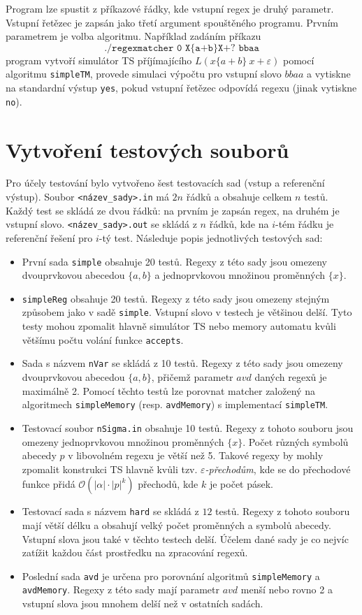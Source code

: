 \documentclass[thesis=B,czech]{FITthesis}[2019/12/23]
\theoremstyle{definition}
\begin{document}
Program lze spustit z příkazové řádky, kde vstupní regex je druhý parametr. Vstupní řetězec je zapsán jako třetí argument spouštěného programu. Prvním parametrem je volba algoritmu. Například zadáním příkazu $$\texttt{./regexmatcher 0 X\{a+b\}X+? bbaa}$$ program vytvoří simulátor TS příjímajícího ${L(x\{a+b\}\ x+\varepsilon)}$ pomocí algoritmu \texttt{simpleTM}, provede simulaci výpočtu pro vstupní slovo $bbaa$ a vytiskne na standardní výstup \texttt{yes}, pokud vstupní řetězec odpovídá regexu (jinak vytiskne \texttt{no}).

\section{Vytvoření testových souborů}
Pro účely testování bylo vytvořeno šest testovacích sad (vstup a referenční výstup). Soubor \texttt{<název\_sady>.in} má $2n$ řádků a obsahuje celkem $n$ testů. Každý test se skládá ze dvou řádků: na prvním je zapsán regex, na druhém je vstupní slovo. \texttt{<název\_sady>.out} se skládá z $n$ řádků, kde na $i$-tém řádku je referenční řešení pro $i$-tý test. Následuje popis jednotlivých testových sad:
\begin{itemize}
	\item{První sada \texttt{simple} obsahuje 20 testů. Regexy z této sady jsou omezeny dvouprvkovou abecedou $\{a, b\}$ a jednoprvkovou množinou proměnných $\{x\}$.}
	\item{\texttt{simpleReg} obsahuje 20 testů. Regexy z této sady jsou omezeny stejným způsobem jako v sadě \texttt{simple}. Vstupní slovo v testech je většinou delší. Tyto testy mohou zpomalit hlavně simulátor TS nebo memory automatu kvůli většímu počtu volání funkce \texttt{accepts}. }
	\item{Sada s názvem \texttt{nVar} se skládá z 10 testů. Regexy z této sady jsou omezeny dvouprvkovou abecedou $\{a, b\}$, přičemž parametr $avd$ daných regexů je maximálně 2. Pomocí těchto testů lze porovnat matcher založený na algoritmech \texttt{simpleMemory} (resp. \texttt{avdMemory}) s implementací \texttt{simpleTM}.}
	\item{Testovací soubor \texttt{nSigma.in} obsahuje 10 testů. Regexy z tohoto souboru jsou omezeny jednoprvkovou množinou proměnných $\{x\}$. Počet různých symbolů abecedy $p$ v libovolném regexu je větší než 5. Takové regexy by mohly zpomalit konstrukci TS hlavně kvůli tzv. \emph{$\varepsilon$-přechodům}, kde se do přechodové funkce přidá $\mathcal{O}(|\alpha|\cdot|p|^{k})$ přechodů, kde $k$ je počet pásek. }
	\item{Testovací sada s názvem \texttt{hard} se skládá z $12$ testů. Regexy z tohoto souboru mají větší délku a obsahují velký počet proměnných a symbolů abecedy. Vstupní slova jsou také v těchto testech delší. Účelem dané sady je co nejvíc zatížit každou část prostředku na zpracování regexů.}
	\item{Poslední sada \texttt{avd} je určena pro porovnání algoritmů \texttt{simpleMemory} a \texttt{avdMemory}. Regexy z této sady mají parametr $avd$ menší nebo rovno 2 a vstupní slova jsou mnohem delší než v ostatních sadách.}
\end{itemize}
\end{document}
